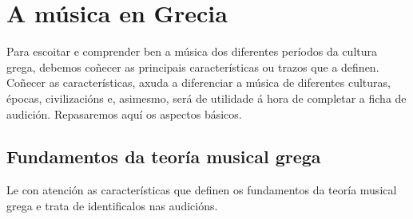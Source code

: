 %
\section{A música en Grecia}
%
Para escoitar e comprender ben a música dos diferentes períodos da cultura grega, debemos coñecer as principais características ou trazos que a definen. Coñecer as características, axuda a diferenciar a música de diferentes culturas, épocas, civilizacións e, asimesmo, será de utilidade á hora de completar a ficha de audición. Repasaremos aquí os aspectos básicos.
%
\subsection*{Fundamentos da teoría musical grega}\label{fundamentos}
%
Le con atención as características que definen os fundamentos da teoría musical grega e trata de identificalos nas audicións.
